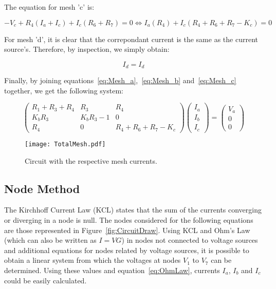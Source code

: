 The equation for mesh 'c' is:

\begin{equation}
  -V_c+R_4(I_a+I_c)+I_c(R_6+R_7)=0 \Leftrightarrow I_a(R_4)+I_c(R_4+R_6+R_7-K_c)=0
  \label{eq:Mesh_c}
\end{equation}

For mesh 'd', it is clear that the correpondant current is the same as the current source's. Therefore, by inspection, we simply obtain:

\begin{equation}
  I_d=I_d
  \label{eq:Mesh_d}
\end{equation}

Finally, by joining equations~\ref{eq:Mesh_a},~\ref{eq:Mesh_b} and~\ref{eq:Mesh_c} together, we get the following system:

\begin{equation}
  \begin{pmatrix}
    R_1+R_3+R_4 & R_3 & R_4 \\
    K_bR_3 & K_bR_3-1 & 0 \\
    R_4 & 0 & R_4+R_6+R_7-K_c
  \end{pmatrix}
  \begin{pmatrix}
    I_a  \\
    I_b  \\
    I_c
  \end{pmatrix}
  =
  \begin{pmatrix}
    V_a  \\
    0  \\
    0
  \end{pmatrix}
  \label{eq:LinearSystem1}
\end{equation}

\begin{figure}[H] \centering
  \texttt{[image: TotalMesh.pdf]}
  \caption{Circuit with the respective mesh currents.}
  \label{fig:TotalMesh}
\end{figure}


\subsection{Node Method}

The Kirchhoff Current Law (KCL) states that the sum of the currents converging or diverging in a node is null. The nodes considered for the following equations are those represented in Figure~\ref{fig:CircuitDraw}. Using KCL and Ohm's Law (which can also be written as $I=VG$) in nodes not connected to voltage sources and additional equations for nodes related by voltage sources, it is possible to obtain a linear system from which the voltages at nodes $V_1$ to $V_7$ can be determined. Using these values and equation~\ref{eq:OhmLaw}, currents $I_a$, $I_b$ and $I_c$ could be easily calculated.

